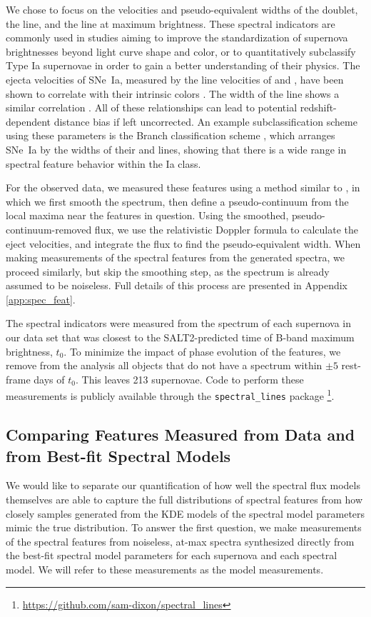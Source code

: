 We chose to focus on the velocities and pseudo-equivalent widths of the \CaIIHK{} doublet, the \SiIIblue line, and the \SiIIred line at maximum brightness. These spectral indicators are commonly used in studies aiming to improve the standardization of supernova brightnesses beyond light curve shape and color, or to quantitatively subclassify Type Ia supernovae in order to gain a better understanding of their physics. The ejecta velocities of SNe~Ia, measured by the line velocities of \SiIIred and \CaIIHK{}, have been shown to correlate with their intrinsic colors \citep{foley_measuring_2011, foley_velocity_2011, foley_relation_2012, mandel_type_2014}. The width of the \SiIIred line shows a similar correlation \citep{foley_velocity_2011}. All of these relationships can lead to potential redshift-dependent distance bias if left uncorrected. An example subclassification scheme using these parameters is the Branch classification scheme \citep{branch_comparative_2006}, which arranges SNe~Ia by the widths of their \SiIIblue and \SiIIred lines, showing that there is a wide range in spectral feature behavior within the Ia class. 

For the observed data, we measured these features using a method similar to \cite{blondin_using_2006}, in which we first smooth the spectrum, then define a pseudo-continuum from the local maxima near the features in question. Using the smoothed, pseudo-continuum-removed flux, we use the relativistic Doppler formula to calculate the eject velocities, and integrate the flux to find the pseudo-equivalent width. When making measurements of the spectral features from the generated spectra, we proceed similarly, but skip the smoothing step, as the spectrum is already assumed to be noiseless. Full details of this process are presented in Appendix \ref{app:spec_feat}. 

The spectral indicators were measured from the spectrum of each supernova in our data set that was closest to the SALT2-predicted time of B-band maximum brightness, $t_0$. To minimize the impact of phase evolution of the features, we remove from the analysis all objects that do not have a spectrum within $\pm 5$ rest-frame days of $t_0$. This leaves 213 supernovae. Code to perform these measurements is publicly available through the \verb|spectral_lines| package \footnote{\url{https://github.com/sam-dixon/spectral_lines}}.

\subsection{Comparing Features Measured from Data and from Best-fit Spectral Models}
We would like to separate our quantification of how well the spectral flux models themselves are able to capture the full distributions of spectral features from how closely samples generated from the KDE models of the spectral model parameters mimic the true distribution. To answer the first question, we make measurements of the spectral features from noiseless, at-max spectra synthesized directly from the best-fit spectral model parameters for each supernova and each spectral model. We will refer to these measurements as the model measurements.

